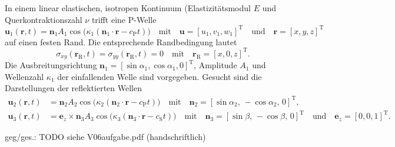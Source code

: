 

In einem linear elastischen, isotropen Kontinuum (Elastizitätsmodul $E$ und Querkontraktionszahl $\nu$ trifft eine P-Welle
\begin{equation*}
\mathbf{u}_1(\mathbf{r},t)=\mathbf{n}_1 A_1 \cos\bigl(\kappa_1 (\mathbf{n}_1\cdot \mathbf{r}-c_\mathrm{P}t)\bigr) 
\quad \text{mit} \quad
\mathbf{u}=[u_1,v_1,w_1]^\mathrm{T}
\quad \text{und} \quad
\mathbf{r}=[x,y,z]^\mathrm{T}
\end{equation*}
auf einen festen Rand. Die entsprechende Randbedingung lautet
\begin{equation*}
\sigma_{xy}(\mathbf{r}_\mathrm{R},t) = \sigma_{yy}(\mathbf{r}_\mathrm{R},t) = 0
\quad \text{mit} \quad
\mathbf{r}_\mathrm{R}=[x,0,z]^\mathrm{T}. 
\end{equation*}
Die Ausbreitungsrichtung $\mathbf{n}_1=[\sin\alpha_1, \cos\alpha_1, 0]^\mathrm{T}$, Amplitude $A_1$ und Wellenzahl $\kappa_1$ der einfallenden Welle sind vorgegeben.
Gesucht sind die Darstellungen der reflektierten Wellen
\begin{align*}
 \mathbf{u}_2(\mathbf{r},t) &= \mathbf{n}_2 A_2 \cos\bigl(\kappa_2 (\mathbf{n}_2\cdot \mathbf{r}-c_\mathrm{P}t)\bigr)
 \quad \text{mit} \quad
 \mathbf{n}_2=[\sin\alpha_2,\, -\cos\alpha_2,\, 0]^\mathrm{T}, \\
 \mathbf{u}_3(\mathbf{r},t) &= \mathbf{e}_z\times\mathbf{n}_3 A_3 \cos\bigl(\kappa_3 (\mathbf{n}_3\cdot \mathbf{r}-c_\mathrm{S}t)\bigr)
 \quad \text{mit} \quad
 \mathbf{n}_3=[\sin\beta,\, -\cos\beta,\, 0]^\mathrm{T}
 \quad \text{und} \quad
 \mathbf{e}_z=[0,0,1]^\mathrm{T}.
\end{align*}

 geg/ges.: TODO siehe V06aufgabe.pdf (handschriftlich)
